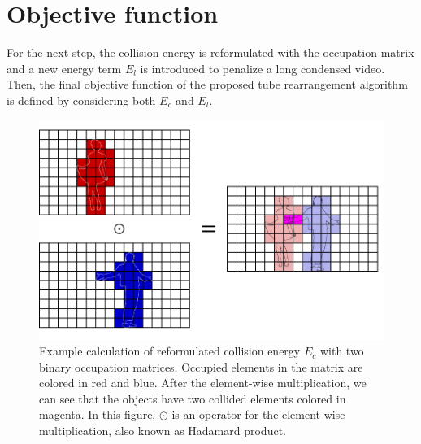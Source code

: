 \documentclass[11pt]{hyu_thesis}
\begin{document}

\section{Objective function}
For the next step, the collision energy is reformulated with the occupation matrix and a new energy term $E_l$ is introduced to penalize a long condensed video. Then, the final objective function of the proposed tube rearrangement algorithm is defined by considering both $E_c$ and $E_l$. 
\begin{figure}
	\centering
	\includegraphics[width=0.8\linewidth]{hadamard-prod.pdf}
	\caption{Example calculation of reformulated collision energy $E_c$ with two binary occupation matrices. Occupied elements in the matrix are colored in red and blue. After the element-wise multiplication, we can see that the objects have two collided elements colored in magenta. In this figure, $\odot$ is an operator for the element-wise multiplication, also known as Hadamard product.}
	\label{fig:hadamard_prod}
\end{figure}
\end{document}
